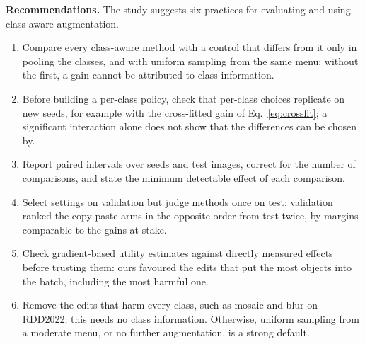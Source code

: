 \documentclass[conference]{IEEEtran}
\begin{document}
\noindent\textbf{Recommendations.} The study suggests six practices for evaluating and using class-aware augmentation.
\begin{enumerate}
    \item Compare every class-aware method with a control that differs from it only in pooling the classes, and with uniform sampling from the same menu; without the first, a gain cannot be attributed to class information.
    \item Before building a per-class policy, check that per-class choices replicate on new seeds, for example with the cross-fitted gain of Eq.~\eqref{eq:crossfit}; a significant interaction alone does not show that the differences can be chosen by.
    \item Report paired intervals over seeds and test images, correct for the number of comparisons, and state the minimum detectable effect of each comparison.
    \item Select settings on validation but judge methods once on test: validation ranked the copy-paste arms in the opposite order from test twice, by margins comparable to the gains at stake.
    \item Check gradient-based utility estimates against directly measured effects before trusting them: ours favoured the edits that put the most objects into the batch, including the most harmful one.
    \item Remove the edits that harm every class, such as mosaic and blur on RDD2022; this needs no class information. Otherwise, uniform sampling from a moderate menu, or no further augmentation, is a strong default.
\end{enumerate}
\end{document}
